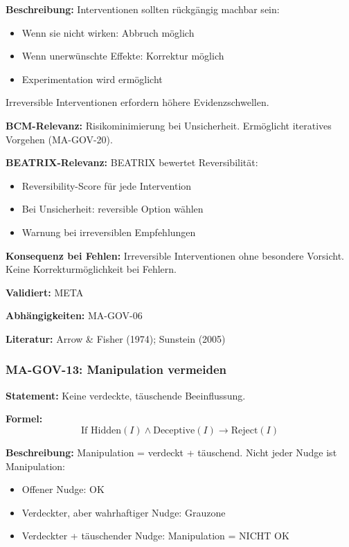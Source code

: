 \textbf{Beschreibung:}
Interventionen sollten rückgängig machbar sein:
\begin{itemize}
    \item Wenn sie nicht wirken: Abbruch möglich
    \item Wenn unerwünschte Effekte: Korrektur möglich
    \item Experimentation wird ermöglicht
\end{itemize}
Irreversible Interventionen erfordern höhere Evidenzschwellen.

\textbf{BCM-Relevanz:}
Risikominimierung bei Unsicherheit. Ermöglicht iteratives Vorgehen (MA-GOV-20).

\textbf{BEATRIX-Relevanz:}
BEATRIX bewertet Reversibilität:
\begin{itemize}
    \item Reversibility-Score für jede Intervention
    \item Bei Unsicherheit: reversible Option wählen
    \item Warnung bei irreversiblen Empfehlungen
\end{itemize}

\textbf{Konsequenz bei Fehlen:}
Irreversible Interventionen ohne besondere Vorsicht. Keine Korrekturmöglichkeit bei Fehlern.

\textbf{Validiert:} META

\textbf{Abhängigkeiten:} MA-GOV-06

\textbf{Literatur:} Arrow \& Fisher (1974); Sunstein (2005)


\subsubsection*{MA-GOV-13: Manipulation vermeiden}

\textbf{Statement:} Keine verdeckte, täuschende Beeinflussung.

\textbf{Formel:}
\begin{equation}
\text{If } \text{Hidden}(I) \land \text{Deceptive}(I) \rightarrow \text{Reject}(I)
\end{equation}

\textbf{Beschreibung:}
Manipulation = verdeckt + täuschend. Nicht jeder Nudge ist Manipulation:
\begin{itemize}
    \item Offener Nudge: OK
    \item Verdeckter, aber wahrhaftiger Nudge: Grauzone
    \item Verdeckter + täuschender Nudge: Manipulation = NICHT OK
\end{itemize}


